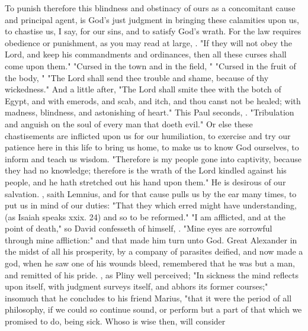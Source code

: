 To punish therefore this blindness and obstinacy of ours as a concomitant cause
and principal agent, is God's just judgment in bringing these calamities upon
us, to chastise us, I say, for our sins, and to satisfy God's wrath. For the
law requires obedience or punishment, as you may read at large, . "If they will not obey the Lord, and keep his commandments
and ordinances, then all these curses shall come upon them."
"Cursed in the town and in the field, \etc{}"
"Cursed in the fruit of the body, \etc{}"
"The Lord shall send thee trouble and shame, because of thy
wickedness." And a little after, "The Lord shall smite thee
with the botch of Egypt, and with emerods, and scab, and itch, and thou canst
not be healed; with madness, blindness, and astonishing of
heart." This Paul seconds, . "Tribulation and anguish
on the soul of every man that doeth evil." Or else these chastisements are
inflicted upon us for our humiliation, to exercise and try our patience here in
this life to bring us home, to make us to know God ourselves, to inform and
teach us wisdom. "Therefore is my people gone into
captivity, because they had no knowledge; therefore is the wrath of the Lord
kindled against his people, and he hath stretched out his hand upon them." He
is desirous of our salvation. ,
saith Lemnius, and for that cause pulls us by the ear many times, to put us in
mind of our duties: "That they which erred might have understanding, (as Isaiah
speaks xxix. 24) and so to be reformed." "I am afflicted,
and at the point of death," so David confesseth of himself, . "Mine eyes are sorrowful through mine
affliction:" and that made him turn unto God. Great Alexander in the midst of
all his prosperity, by a company of parasites deified, and now made a god, when
he saw one of his wounds bleed, remembered that he was but a man, and remitted
of his pride. , as
Pliny well perceived; "In sickness the mind reflects upon
itself, with judgment surveys itself, and abhors its former courses;" insomuch
that he concludes to his friend Marius, "that it were the
period of all philosophy, if we could so continue sound, or perform but a part
of that which we promised to do, being sick. Whoso is wise then, will consider
